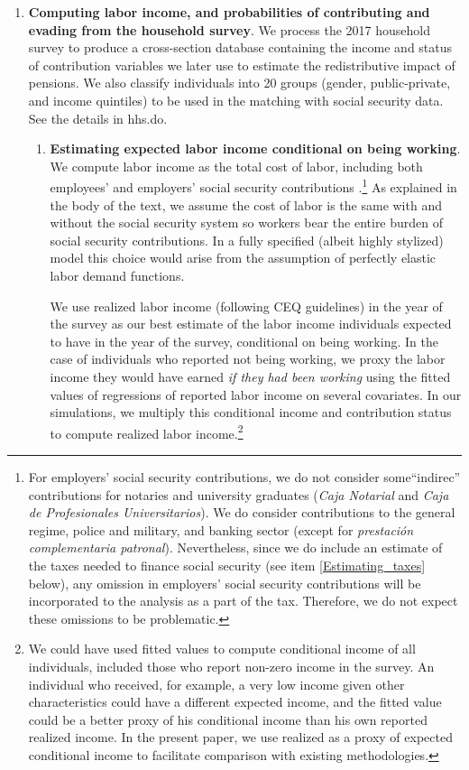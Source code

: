 \documentclass{article}
\begin{document}
\begin{enumerate}
    \item \textbf{Computing labor income, and probabilities of contributing and evading from the household survey}. We process the 2017 household survey to produce a cross-section database containing the income and status of contribution variables we later use to estimate the redistributive impact of pensions. We also classify individuals into 20 groups (gender, public-private, and income quintiles) to be used in the matching with social security data.  See the details in hhs.do.
    
    \begin{enumerate}
    \item \label{item:income1}  \textbf{Estimating expected labor income conditional on being working}. We compute labor income as the total cost of labor, including both employees' and employers' social security contributions \parencite[for a similar choice, see][section 2.1.2.1.1]{Blanchet2021}.\footnote{For employers' social security contributions, we do not consider some``indirec'' contributions for notaries and university graduates (\emph{Caja Notarial} and \emph{Caja de Profesionales Universitarios}). We do consider contributions to the general regime, police and military, and banking sector (except for \emph{prestación complementaria patronal}). Nevertheless, since we do include an estimate of the taxes needed to finance social security (see item \ref{Estimating_taxes} below), any omission in employers' social security contributions will be incorporated to the analysis as a part of the tax. Therefore, we do not expect these omissions to be problematic.}  As explained in the body of the text, we assume the cost of labor is the same with and without the social security system so workers bear the entire burden of social security contributions. In a fully specified (albeit highly stylized) model this choice would arise from the assumption of perfectly elastic labor demand functions.   
    
    We use realized labor income (following CEQ guidelines) in the year of the survey as our best estimate of the labor income individuals expected to have in the year of the survey, conditional on being working. In the case of individuals who reported not being working, we proxy the labor income they would have earned \textit{if they had been working} using the fitted values of regressions of reported labor income on several covariates. In our simulations, we multiply this conditional income and contribution status to compute realized labor income.\footnote{We could have used fitted values to compute conditional income of all individuals, included those who report non-zero income in the survey. An individual who received, for example, a very low income given other characteristics could have a different expected income, and the fitted value could be a better proxy of his conditional income than his own reported realized income. In the present paper, we use realized as a proxy of expected conditional income to facilitate comparison with existing methodologies. } 
    

\end{enumerate}
\end{enumerate}
\end{document}
